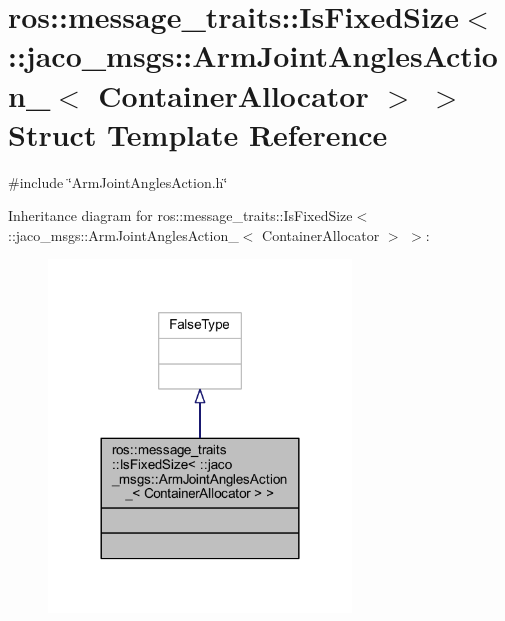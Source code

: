\hypertarget{structros_1_1message__traits_1_1IsFixedSize_3_01_1_1jaco__msgs_1_1ArmJointAnglesAction___3_01ContainerAllocator_01_4_01_4}{}\section{ros\+:\+:message\+\_\+traits\+:\+:Is\+Fixed\+Size$<$ \+:\+:jaco\+\_\+msgs\+:\+:Arm\+Joint\+Angles\+Action\+\_\+$<$ Container\+Allocator $>$ $>$ Struct Template Reference}
\label{structros_1_1message__traits_1_1IsFixedSize_3_01_1_1jaco__msgs_1_1ArmJointAnglesAction___3_01ContainerAllocator_01_4_01_4}


{\ttfamily \#include \char`\"{}Arm\+Joint\+Angles\+Action.\+h\char`\"{}}



Inheritance diagram for ros\+:\+:message\+\_\+traits\+:\+:Is\+Fixed\+Size$<$ \+:\+:jaco\+\_\+msgs\+:\+:Arm\+Joint\+Angles\+Action\+\_\+$<$ Container\+Allocator $>$ $>$\+:
\nopagebreak
\begin{figure}[H]
\begin{center}
\leavevmode
\includegraphics[width=228pt]{d3/dab/structros_1_1message__traits_1_1IsFixedSize_3_01_1_1jaco__msgs_1_1ArmJointAnglesAction___3_01Con56eab3532811f3b8d02047c89e237d85}
\end{center}
\end{figure}


